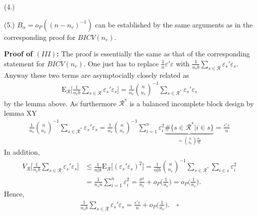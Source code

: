 \documentclass[Research_Module_ES.tex]{subfiles}
\begin{document}
(4.)


(5.)
$B_{\alpha} = o_P((n-n_v)^{-1})$ can be established by the same arguments as in the corresponding proof for $BICV(n_v)$.

\textbf{Proof of $(III)$:} 
The proof is essentially the same as that of the corresponding statement for $BICV(n_v)$. One just has to replace $\frac{1}{n}\varepsilon'\varepsilon$ with $\frac{1}{n_vb}\sum_{s\in \mathcal{R}}\varepsilon_s'\varepsilon_s$. Anyway these two terms are asymptocially closely related as
\begin{align*}
\mathrm{E}_\mathcal{R} \biggl[ \frac{1}{n_vb}\sum_{s\in \mathcal{R}}\varepsilon_s'\varepsilon_s\biggr] 
=\frac{1}{n_v}\binom{n}{n_v}^{-1}\sum_{s\in \mathcal{R}^\ast}\varepsilon_s'\varepsilon_s
\end{align*}
by the lemma above. As furthermore $\mathcal{R}^\ast$ is a balanced incomplete block design by lemma XY 
\begin{align*}
\frac{1}{n_v}\binom{n}{n_v}^{-1}\sum_{s\in \mathcal{R}^\ast}\varepsilon_s'\varepsilon_s
= \frac{1}{n_v}\binom{n}{n_v}^{-1}\sum_{i=1}^n \varepsilon_i^2 \underbrace{\#\{s\in \mathcal{R}^\ast | i\in s\}}_{=\binom{n}{n_v}\frac{n_v}{n}}
= \frac{\varepsilon'\varepsilon}{n}
\end{align*}
In addition,
\begin{align*}
V_\mathcal{R} \biggl[ \frac{1}{n_vb}\sum_{s\in \mathcal{R}}\varepsilon_s'\varepsilon_s\biggr]
&\le \frac{1}{n_v^2b}\mathrm{E}_\mathcal{R} \bigl[(\varepsilon_s'\varepsilon_s)^2\bigr]
= \frac{1}{n_v^2b}\binom{n}{n_v}^{-1}\sum_{s\in \mathcal{R}^\ast}\sum_{i\in s} \varepsilon_i^2\\
&= \frac{1}{n_vn} \sum_{i=1}^n \varepsilon_i^2 
= \frac{\sigma^2}{n_v} + o_P\biggl(\frac{1}{n_v}\biggr)
= o_P\biggl(\frac{1}{n_v}\biggr).
\end{align*}
Hence, 
\begin{align*}
\frac{1}{n_vb}\sum_{s\in \mathcal{R}}\varepsilon_s'\varepsilon_s =\frac{\varepsilon'\varepsilon}{n} +o_P\biggl(\frac{1}{n_v}\biggr). \quad \square
\end{align*}
\end{document}
